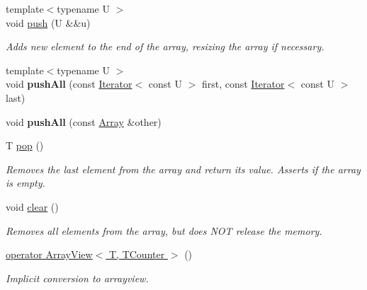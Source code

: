 \begin{DoxyCompactItemize}
\hypertarget{classArray_a1e86cc82e0f42858019f53d32b199b12}{}\label{classArray_a1e86cc82e0f42858019f53d32b199b12} 
{\footnotesize template$<$typename U $>$ }\\void \hyperlink{classArray_a1e86cc82e0f42858019f53d32b199b12}{push} (U \&\&u)
\begin{DoxyCompactList}\small\item\em Adds new element to the end of the array, resizing the array if necessary. \end{DoxyCompactList}\item 
\hypertarget{classArray_a5797217fb33af6d856c540a0bce23cc1}{}\label{classArray_a5797217fb33af6d856c540a0bce23cc1} 
{\footnotesize template$<$typename U $>$ }\\void {\bfseries push\+All} (const \hyperlink{classIterator}{Iterator}$<$ const U $>$ first, const \hyperlink{classIterator}{Iterator}$<$ const U $>$ last)
\item 
\hypertarget{classArray_adeead0fb323a28435fa16a6fe13559d1}{}\label{classArray_adeead0fb323a28435fa16a6fe13559d1} 
void {\bfseries push\+All} (const \hyperlink{classArray}{Array} \&other)
\item 
\hypertarget{classArray_a0ba794d2239817cfeed5512599eb6679}{}\label{classArray_a0ba794d2239817cfeed5512599eb6679} 
T \hyperlink{classArray_a0ba794d2239817cfeed5512599eb6679}{pop} ()
\begin{DoxyCompactList}\small\item\em Removes the last element from the array and return its value. Asserts if the array is empty. \end{DoxyCompactList}\item 
\hypertarget{classArray_ad36b577886afcb82a3c744c3339d2adb}{}\label{classArray_ad36b577886afcb82a3c744c3339d2adb} 
void \hyperlink{classArray_ad36b577886afcb82a3c744c3339d2adb}{clear} ()
\begin{DoxyCompactList}\small\item\em Removes all elements from the array, but does N\+OT release the memory. \end{DoxyCompactList}\item 
\hypertarget{classArray_a99b7e81488b19f5469572ed8a89701cb}{}\label{classArray_a99b7e81488b19f5469572ed8a89701cb} 
\hyperlink{classArray_a99b7e81488b19f5469572ed8a89701cb}{operator Array\+View$<$ T, T\+Counter $>$} ()
\begin{DoxyCompactList}\small\item\em Implicit conversion to arrayview. \end{DoxyCompactList}\item 

\end{DoxyCompactItemize}

